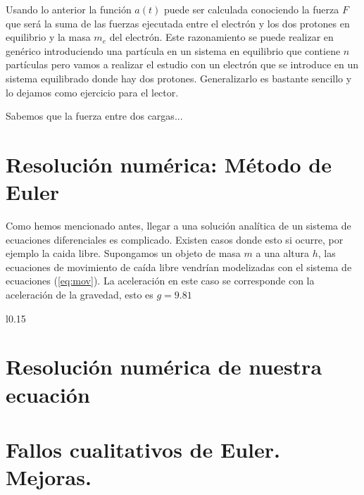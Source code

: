 Usando lo anterior la función $a(t)$ puede ser calculada conociendo la fuerza $F$ que será la suma de las fuerzas ejecutada entre el electrón y los dos protones en equilibrio y la masa $m_e$ del electrón. Este razonamiento se puede realizar en genérico introduciendo una partícula en un sistema en equilibrio que contiene $n$ partículas pero vamos a realizar el estudio con un electrón que se introduce en un sistema equilibrado donde hay dos protones. Generalizarlo es bastante sencillo y lo dejamos como ejercicio para el lector. 

Sabemos que la fuerza entre dos cargas...
  
\section{Resolución numérica: Método de Euler}
Como hemos mencionado antes, llegar a una solución analítica de un sistema de ecuaciones diferenciales es complicado. Existen casos donde esto si ocurre, por ejemplo la caida libre. Supongamos un objeto de masa $m$ a una altura $h$, las ecuaciones de movimiento de caída libre vendrían modelizadas con el sistema de ecuaciones (\ref{eq:mov}). La aceleración en este caso se corresponde con la aceleración de la gravedad, esto es $g=9.81$  
\begin{wrapfigure}{l}{0.15\textwidth}\vspace{-0.9cm}
\begin{center}

\end{center}
\end{wrapfigure}



\section{Resolución numérica de nuestra ecuación}

\section{Fallos cualitativos de Euler. Mejoras.}

%
%



\newpage
